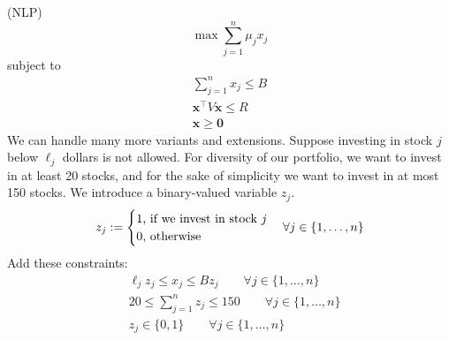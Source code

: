 \begin{exbox}
\begin{example}
        (NLP)
        \[\max \sum_{j = 1}^{n}\mu_jx_j\]
        subject to
        \begin{align*}
            \sum_{j = 1}^{n}x_j\leqslant B  \\
            \bm{x}^\top  V\bm{x}\leqslant R \\
            \bm{x}\geqslant  \bm{0}
        \end{align*}
        We can handle many more variants and extensions. Suppose investing in stock
        $j$ below $\ell_j$ dollars is not allowed. For diversity of our portfolio, we
        want to invest in at least 20 stocks, and for the sake of simplicity we want
        to invest in at most 150 stocks. We introduce a binary-valued variable $z_j$.
        \[z_j:=
            \begin{cases}
                1 \text{, if we invest in stock $j$} \\
                0 \text{, otherwise}
            \end{cases}
            \forall j\in\{1,\dots,n\}\\
        \]
        Add these constraints:
        \begin{align*}
             & \ell_j z_j\leqslant x_j\leqslant B z_j\qquad \forall j\in\{1,\dots,n\}        \\
             & 20\leqslant \sum_{j = 1}^{n}z_j\leqslant 150 \qquad \forall j\in\{1,\dots,n\} \\
             & z_j\in\{0,1\} \qquad \forall j\in\{1,\dots,n\}                                \\
        \end{align*}
    \end{example}
\end{exbox}
